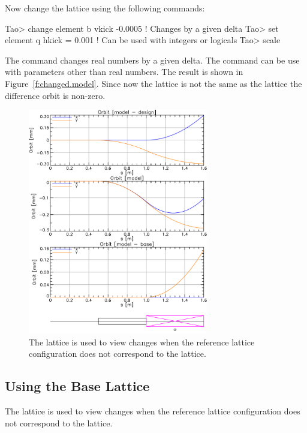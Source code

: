 \documentclass{hitec}
\begin{document}
Now change the  lattice using the following commands:
\begin{code}
Tao> change element b vkick  -0.0005   ! Changes by a given delta
Tao> set element q hkick = 0.001       ! Can be used with integers or logicals
Tao> scale
\end{code}
The  command changes real numbers by a given delta. The  command can be use with
parameters other than real numbers.  The result is shown in Figure~\ref{f:changed.model}. Since now
the  lattice is not the same as the  lattice the difference orbit is non-zero.

\begin{figure}[tb]
  \centering
  \includegraphics[width=0.7\textwidth]{with-base.pdf}
  \caption{The  lattice is used to view changes when the reference lattice configuration
does not correspond to the  lattice.}
  \label{f:base}
\end{figure}

\subsection{Using the Base Lattice}

The  lattice is used to view changes when the reference lattice configuration does not
correspond to the  lattice.
\end{document}
